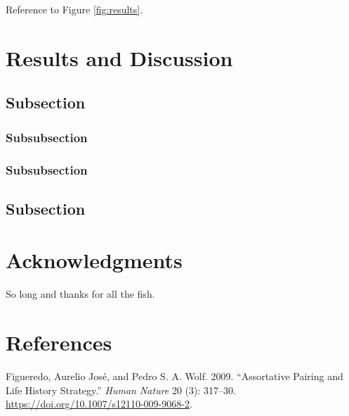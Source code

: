 \documentclass[fleqn,10pt,lineno]{wlpeerj} %
\begin{document}
Reference to Figure \ref{fig:results}.

\hypertarget{results-and-discussion}{%
\section*{Results and Discussion}\label{results-and-discussion}}

\lipsum[10]

\hypertarget{subsection-2}{%
\subsection*{Subsection}\label{subsection-2}}

\lipsum[11]

\hypertarget{subsubsection}{%
\subsubsection*{Subsubsection}\label{subsubsection}}

\lipsum[12]

\hypertarget{subsubsection-1}{%
\subsubsection*{Subsubsection}\label{subsubsection-1}}

\lipsum[14]

\hypertarget{subsection-3}{%
\subsection*{Subsection}\label{subsection-3}}

\lipsum[15-20]

\hypertarget{acknowledgments}{%
\section*{Acknowledgments}\label{acknowledgments}}

So long and thanks for all the fish.

\hypertarget{references}{%
\section*{References}\label{references}}

\hypertarget{refs}{}
\leavevmode\hypertarget{ref-Figueredo:2009dg}{}%
Figueredo, Aurelio José, and Pedro S. A. Wolf. 2009. ``Assortative Pairing and Life History Strategy.'' \emph{Human Nature} 20 (3): 317--30. \url{https://doi.org/10.1007/s12110-009-9068-2}.
\end{document}
